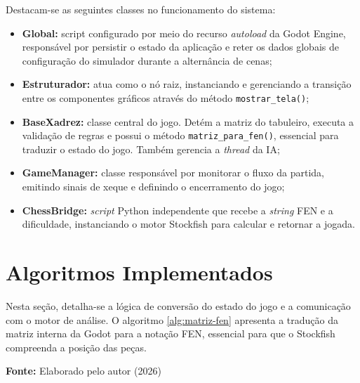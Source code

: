 Destacam-se as seguintes classes no funcionamento do sistema:
\begin{itemize}
	\item \textbf{Global:} script configurado por meio do recurso \textit{autoload} da Godot Engine, responsável por persistir o estado da aplicação e reter os dados globais de configuração do simulador durante a alternância de cenas;
	\item \textbf{Estruturador:} atua como o nó raiz, instanciando e gerenciando a transição entre os componentes gráficos através do método \texttt{mostrar\_tela()};
	\item \textbf{BaseXadrez:} classe central do jogo. Detém a matriz do tabuleiro, executa a validação de regras e possui o método \texttt{matriz\_para\_fen()}, essencial para traduzir o estado do jogo. Também gerencia a \textit{thread} da IA;
	\item \textbf{GameManager:} classe responsável por monitorar o fluxo da partida, emitindo sinais de xeque e definindo o encerramento do jogo;
	\item \textbf{ChessBridge:} \textit{script} Python independente que recebe a \textit{string} FEN e a dificuldade, instanciando o motor Stockfish para calcular e retornar a jogada.
\end{itemize}

\section{Algoritmos Implementados}

Nesta seção, detalha-se a lógica de conversão do estado do jogo e a comunicação com o motor de análise. O algoritmo \ref{alg:matriz-fen} apresenta a tradução da matriz interna da Godot para a notação FEN, essencial para que o Stockfish compreenda a posição das peças.

\begin{algorithm}[H]
	\caption{Lógica de Conversão da Matriz do Tabuleiro para Notação FEN.}
	\label{alg:matriz-fen}
\end{algorithm}
\begin{center}
	\vspace{-0.2cm} %
	\small \textbf{Fonte:} Elaborado pelo autor (2026)
\end{center}

